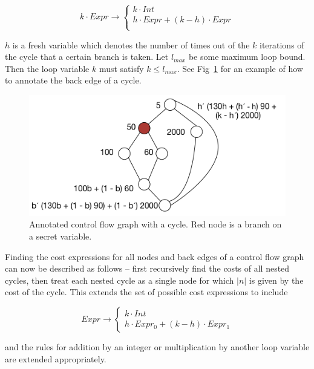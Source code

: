  $$k \cdot Expr \rightarrow \begin{cases}  k \cdot Int \\ h \cdot Expr + (k - h) \cdot Expr \\\end{cases}$$
 
$h$ is a fresh variable which denotes the number of times out of the $k$ iterations of the cycle that a certain branch is taken. Let $l_{max}$ be some maximum loop bound. Then the loop variable $k$ must satisfy $k \leq l_{max}$. See Fig~\ref{fig:imb} for an example of how to annotate the back edge of a cycle.

\begin{figure}
  \includegraphics[scale=.5]{imbalance.png}
  \caption{Annotated control flow graph with a cycle. Red node is a branch on a secret variable.}
  \label{fig:imb}
\end{figure}

Finding the cost expressions for all nodes and back edges of a control flow graph can now be described as follows -- first recursively find the costs of all nested cycles, then treat each nested cycle as a single node for which $|n|$ is given by the cost of the cycle. This extends the set of possible cost expressions to include 

$$Expr \rightarrow \begin{cases} k \cdot Int  \\ h \cdot Expr_{0} + (k - h) \cdot Expr_{1} \end{cases}$$

and the rules for addition by an integer or multiplication by another loop variable are extended appropriately. 
 
